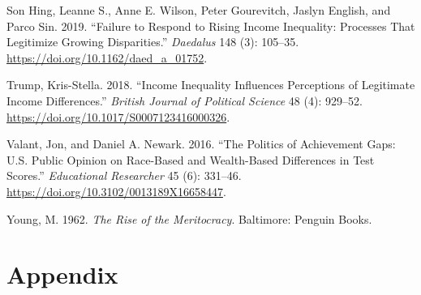 \documentclass[
]{article}
\newlength{\cslhangindent}
\newenvironment{CSLReferences}[2] %
 {\begin{list}{}{%
  \setlength{\itemindent}{0pt}
  \setlength{\leftmargin}{0pt}
  \setlength{\parsep}{0pt}
  \ifodd #1
   \setlength{\leftmargin}{\cslhangindent}
   \setlength{\itemindent}{-1\cslhangindent}
  \fi
  \setlength{\itemsep}{#2\baselineskip}}}
 {\end{list}}
\begin{document}
\begin{CSLReferences}{1}{0}
Son Hing, Leanne S., Anne E. Wilson, Peter Gourevitch, Jaslyn English,
and Parco Sin. 2019. {``Failure to {Respond} to {Rising Income
Inequality}: {Processes That Legitimize Growing Disparities}.''}
\emph{Daedalus} 148 (3): 105--35.
\url{https://doi.org/10.1162/daed_a_01752}.

Trump, Kris-Stella. 2018. {``Income {Inequality Influences Perceptions}
of {Legitimate Income Differences}.''} \emph{British Journal of
Political Science} 48 (4): 929--52.
\url{https://doi.org/10.1017/S0007123416000326}.

Valant, Jon, and Daniel A. Newark. 2016. {``The {Politics} of
{Achievement Gaps}: {U}.{S}. {Public Opinion} on {Race-Based} and
{Wealth-Based Differences} in {Test Scores}.''} \emph{Educational
Researcher} 45 (6): 331--46.
\url{https://doi.org/10.3102/0013189X16658447}.

Young, M. 1962. \emph{The Rise of the Meritocracy}. Baltimore: Penguin
Books.

\end{CSLReferences}

\section*{Appendix}\label{appendix-appendix}
\end{document}
